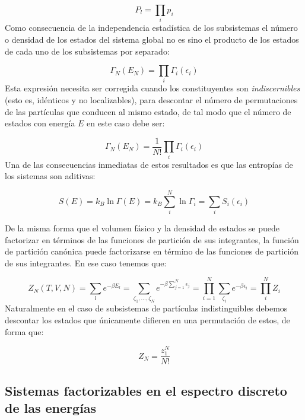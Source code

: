 \documentclass[12pt,a4paper]{article}
\numberwithin{equation}{section}
\numberwithin{figure}{section}
\theoremstyle{definition}
\begin{document}
\begin{equation}
P_l = \prod_i p_i
\end{equation}
Como consecuencia de la independencia estadística de los subsistemas el número o densidad de los estados del sistema global no es sino el producto de los estados de cada uno de los subsistemas por separado:

\begin{equation}
\Gamma_N (E_N) = \prod_i \Gamma_i (\epsilon_i)
\end{equation}
Esta expresión necesita ser corregida cuando los constituyentes son \textit{indiscernibles} (esto es, idénticos y no localizables), para descontar el número de permutaciones de las partículas que conducen al mismo estado, de tal modo que el número de estados con energía $E$ en este caso debe ser:

\begin{equation}
\Gamma_N (E_N) = \frac{1}{N!} \prod_i \Gamma_i (\epsilon_i)
\end{equation}
Una de las consecuencias inmediatas de estos resultados es que las entropías de los sistemas son aditivas:

\begin{equation}
S(E) = k_B \ln \Gamma (E) = k_B \sum_i^N \ln \Gamma_i = \sum_i S_i(\epsilon_i)
\end{equation}

De la misma forma que el volumen fásico y la densidad de estados se puede factorizar en términos de las funciones de partición de sus integrantes, la función de partición canónica puede factorizarse en término de las funciones de partición de sus integrantes. En ese caso tenemos que:

\begin{equation}
Z_N (T,V,N) = \sum_l e^{- \beta E_l}  = \sum_{\zeta_1,...,\zeta_N} e^{-\beta \sum_{j=1}^N \epsilon_j} = \prod_{i=1}^N \sum_{\zeta_i} e^{-\beta \epsilon_i} = \prod_i^N Z_i
\end{equation}
Naturalmente en el caso de subsistemas de partículas indistinguibles debemos descontar los estados que únicamente difieren en una permutación de estos, de forma que:

\begin{equation}
Z_N = \frac{z_1^N}{N!}
\end{equation}

\subsection{Sistemas factorizables en el espectro discreto de las energías}
\end{document}
